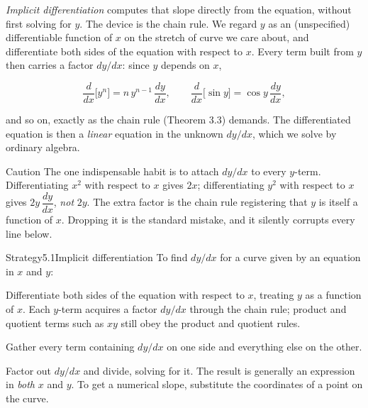 \documentclass[a4paper,12pt,oneside]{memoir}
\begin{document}
\emph{Implicit differentiation} computes that slope directly from the equation, without first solving for \(y\). The device is the chain rule. We regard \(y\) as an (unspecified) differentiable function of \(x\) on the stretch of curve we care about, and differentiate both sides of the equation with respect to \(x\). Every term built from \(y\) then carries a factor \(dy/dx\): since \(y\) depends on \(x\),

\[ \frac{d}{dx}\bigl[y^{n}\bigr] = n\,y^{n-1}\,\frac{dy}{dx}, \qquad \frac{d}{dx}\bigl[\sin y\bigr] = \cos y\,\frac{dy}{dx}, \]

and so on, exactly as the chain rule (Theorem 3.3) demands. The differentiated equation is then a \emph{linear} equation in the unknown \(dy/dx\), which we solve by ordinary algebra.

\begin{envcaution}{Caution}{}{}
The one indispensable habit is to attach \(dy/dx\) to every \(y\)-term. Differentiating \(x^{2}\) with respect to \(x\) gives \(2x\); differentiating \(y^{2}\) with respect to \(x\) gives \(2y\,\dfrac{dy}{dx}\), \emph{not} \(2y\). The extra factor is the chain rule registering that \(y\) is itself a function of \(x\). Dropping it is the standard mistake, and it silently corrupts every line below.
\end{envcaution}
\begin{envstrategy}{Strategy}{5.1}{Implicit differentiation}
To find \(dy/dx\) for a curve given by an equation in \(x\) and \(y\):

\begin{steps}
  \item Differentiate both sides of the equation with respect to \(x\), treating \(y\) as a function of \(x\). Each \(y\)-term acquires a factor \(dy/dx\) through the chain rule; product and quotient terms such as \(xy\) still obey the product and quotient rules.
  \item Gather every term containing \(dy/dx\) on one side and everything else on the other.
  \item Factor out \(dy/dx\) and divide, solving for it. The result is generally an expression in \emph{both} \(x\) and \(y\). To get a numerical slope, substitute the coordinates of a point on the curve.
\end{steps}
\end{envstrategy}
\end{document}
